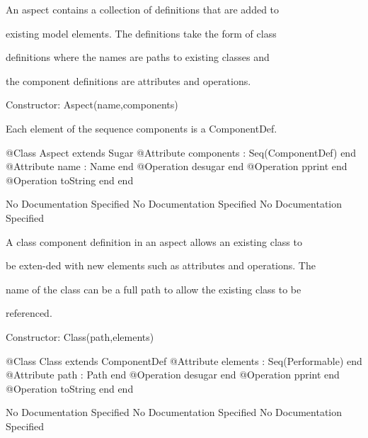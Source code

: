       An aspect contains a collection of definitions that are added to

      existing model elements. The definitions take the form of class

      definitions where the names are paths to existing classes and

      the component definitions are attributes and operations.
     
     Constructor: Aspect(name,components)
     
       Each element of the sequence components is a ComponentDef.
\begin{Interface}
@Class Aspect extends Sugar
  @Attribute components : Seq(ComponentDef) end
  @Attribute name : Name end
  @Operation desugar end
  @Operation pprint end
  @Operation toString end
end
\end{Interface}
No Documentation Specified
No Documentation Specified
No Documentation Specified

       A class component definition in an aspect allows an existing class to

       be exten-ded with new elements such as attributes and operations. The

       name of the class can be a full path to allow the existing class to be

       referenced.
     
       Constructor: Class(path,elements)
\begin{Interface}
@Class Class extends ComponentDef
  @Attribute elements : Seq(Performable) end
  @Attribute path : Path end
  @Operation desugar end
  @Operation pprint end
  @Operation toString end
end
\end{Interface}
No Documentation Specified
No Documentation Specified
No Documentation Specified

